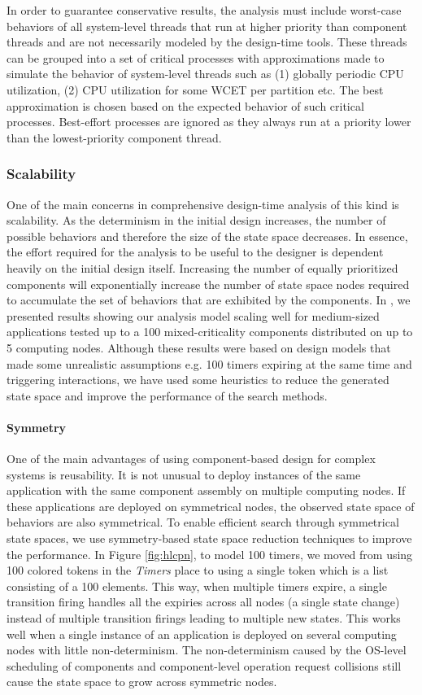 In order to guarantee conservative results, the analysis must include worst-case behaviors of all system-level threads that run at higher priority than component threads and are not necessarily modeled by the design-time tools. These threads can be grouped into a set of critical processes with approximations made to simulate the behavior of system-level threads such as (1) globally periodic CPU utilization, (2) CPU utilization for some WCET per partition etc. The best approximation is chosen based on the expected behavior of such critical processes. Best-effort processes are ignored as they always run at a priority lower than the lowest-priority component thread.

\subsubsection{Scalability}
One of the main concerns in comprehensive design-time analysis of this kind is scalability. As the determinism in the initial design increases, the number of possible behaviors and therefore the size of the state space decreases. In essence, the effort required for the analysis to be useful to the designer is dependent heavily on the initial design itself. Increasing the number of equally prioritized components will exponentially increase the number of state space nodes required to accumulate the set of behaviors that are exhibited by the components. In \cite{MoDeVVa}, we presented results showing our analysis model scaling well for medium-sized applications tested up to a 100 mixed-criticality components distributed on up to 5 computing nodes. Although these results were based on design models that made some unrealistic assumptions e.g. 100 timers expiring at the same time and triggering interactions, we have used some heuristics to reduce the generated state space and improve the performance of the search methods. 
\paragraph{Symmetry}
One of the main advantages of using component-based design for complex systems is reusability. It is not unusual to deploy instances of the same application with the same component assembly on multiple computing nodes. If these applications are deployed on symmetrical nodes, the observed state space of behaviors are also symmetrical. To enable efficient search through symmetrical state spaces, we use symmetry-based state space reduction techniques \cite{Kristensen2000} to improve the performance. In Figure \ref{fig:hlcpn}, to model 100 timers, we moved from using 100 colored tokens in the \emph{Timers} place to using a single token which is a list consisting of a 100 elements. This way, when multiple timers expire, a single transition firing handles all the expiries across all nodes (a single state change) instead of multiple transition firings leading to multiple new states. This works well when a single instance of an application is deployed on several computing nodes with little non-determinism. The non-determinism caused by the OS-level scheduling of components and component-level operation request collisions still cause the state space to grow across symmetric nodes. 
